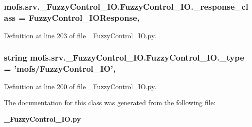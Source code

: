 \subsubsection[{\-\_\-response\-\_\-class}]{\setlength{\rightskip}{0pt plus 5cm}mofs.\-srv.\-\_\-\-Fuzzy\-Control\-\_\-\-I\-O.\-Fuzzy\-Control\-\_\-\-I\-O.\-\_\-response\-\_\-class = {\bf Fuzzy\-Control\-\_\-\-I\-O\-Response}\hspace{0.3cm}{\ttfamily [static]}, {\ttfamily [private]}}\label{classmofs_1_1srv_1_1__FuzzyControl__IO_1_1FuzzyControl__IO_a86c3ed67536ae8583dacff5c38567609}


Definition at line 203 of file \-\_\-\-Fuzzy\-Control\-\_\-\-I\-O.\-py.

\subsubsection[{\-\_\-type}]{\setlength{\rightskip}{0pt plus 5cm}string mofs.\-srv.\-\_\-\-Fuzzy\-Control\-\_\-\-I\-O.\-Fuzzy\-Control\-\_\-\-I\-O.\-\_\-type = 'mofs/{\bf Fuzzy\-Control\-\_\-\-I\-O}'\hspace{0.3cm}{\ttfamily [static]}, {\ttfamily [private]}}\label{classmofs_1_1srv_1_1__FuzzyControl__IO_1_1FuzzyControl__IO_a87bac5f19336c3b57f0516c403064fce}


Definition at line 200 of file \-\_\-\-Fuzzy\-Control\-\_\-\-I\-O.\-py.



The documentation for this class was generated from the following file\-:\begin{DoxyCompactItemize}
\item 
{\bf \-\_\-\-Fuzzy\-Control\-\_\-\-I\-O.\-py}\end{DoxyCompactItemize}
